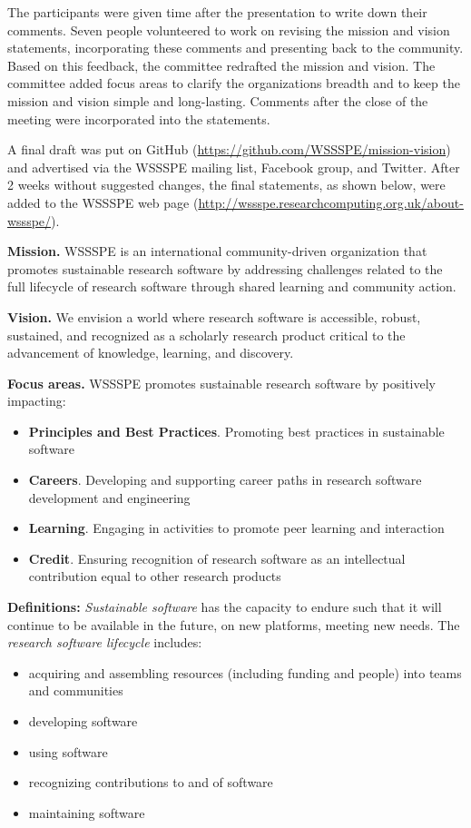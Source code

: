\documentclass[11pt, oneside]{amsart}
\begin{document}
The participants were given time after the presentation to write down their comments.
Seven people volunteered to work on revising the mission and vision statements, incorporating these comments and presenting back to the community.
Based on this feedback, the committee redrafted the mission and vision.
The committee added focus areas to clarify the organizations breadth and to keep the mission and vision simple and long-lasting.
Comments after the close of the meeting were incorporated into the statements.

A final draft was put on GitHub (\url{https://github.com/WSSSPE/mission-vision}) and advertised
via the WSSSPE mailing list, Facebook group, and Twitter.
After 2 weeks without suggested changes, the final statements, as shown below, were added
to the WSSSPE web page (\url{http://wssspe.researchcomputing.org.uk/about-wssspe/}).

{\bf Mission.}
WSSSPE is an international community-driven organization that promotes sustainable research software by addressing challenges related to the full lifecycle of research software through shared learning and community action.

{\bf Vision.}
We envision a world where research software is accessible, robust, sustained, and recognized as a scholarly research product critical to the advancement of knowledge, learning, and discovery.

{\bf Focus areas.}
WSSSPE promotes sustainable research software by positively impacting:
\begin{itemize}
\item {\bf Principles and Best Practices}. Promoting best practices in sustainable software
\item {\bf Careers}. Developing and supporting career paths in research software development and engineering
\item {\bf Learning}. Engaging in activities to promote peer learning and interaction
\item {\bf Credit}. Ensuring recognition of research software as an intellectual contribution equal to other research products
\end{itemize}

\textbf{Definitions:}
\emph{Sustainable software} has the capacity to endure such that it will continue to
be available in the future, on new platforms, meeting new needs.
The \emph{research software lifecycle} includes:
\begin{itemize}
\item acquiring and assembling resources (including funding and people) into teams and communities
\item developing software
\item using software
\item recognizing contributions to and of software
\item maintaining software
\end{itemize}
\end{document}
